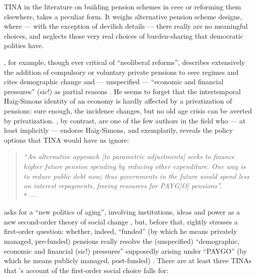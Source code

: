 TINA in the literature on building pension schemes in \gls{ceec} or reforming them elsewhere, takes a peculiar form.
It weighs alternative pension scheme designs, where --- with the exception of devilish details --- there really are no meaningful choices, and neglects those very real choices of burden-sharing that democratic polities have.

\citeauthor{Cerami2009a}, for example, though ever critical of ``neoliberal reforms'', describes extensively the addition of compulsory or voluntary private pensions to \gls{ceec} regimes and cites demographic change and --- unspecified --- ``economic and financial pressures'' (sic!) as partial reasons \citeyearpar[336]{Cerami2009a}.
He seems to forget that the intertemporal Haig-Simons identity of an economy is hardly affected by a privatization of pensions:
sure enough, the incidence changes, but no old age crisis can be averted by privatization.
\cite{Barr2005a}, by contrast, are one of the few authors in the field who --- at least implicitly --- endorse Haig-Simons, and exemplarily, reveals the policy options that TINA would have us ignore:
\begin{quote}
	\emph{``An alternative approach [to parametric adjustments] seeks to finance higher future pension spending by reducing other expenditure.
	One way is to reduce public debt now;
thus governments in the future would spend less on interest repayments, freeing resources for PAYG[O] pensions''.}
	\\*
	--- \citet[152]{Barr2005a}
\end{quote}

\citeauthor{Cerami2009a} asks for a ``new politics of aging'', involving institutions, ideas and power as a new second-order theory of social change \citeyearpar[338]{Cerami2009a}, but, before that, rightly stresses a first-order question:
whether, indeed, ``funded'' (by which he means privately managed, pre-funded) pensions really resolve the (unspecified) ``demographic, economic and financial (sic!) pressures'' supposedly arising under ``PAYGO'' (by which he means publicly managed, post-funded) \citeyearpar[339]{Cerami2009a}.
There are at least three TINAs that \citeauthor{Cerami2009a}'s account of the first-order social choice falls for:


